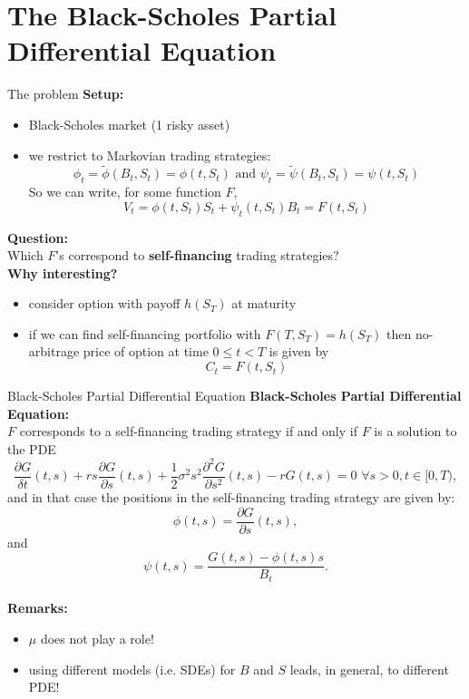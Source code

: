 \documentclass[pdf, handout]{beamer}
\begin{document}
\section[toc=Black-Scholes PDE]{The Black-Scholes Partial Differential Equation}

\begin{frame}{The problem}
\textbf{Setup:}
\begin{itemize}
\item Black-Scholes market (1 risky asset)
\item we restrict to
Markovian trading strategies:
\[
\phi_t=\tilde\phi(B_t, S_t)= \phi(t,S_t) \text{ and } \psi_t=\tilde\psi(B_t, S_t)
=\psi (t, S_t)
\]
So we can write, for some function $F$,
\[
 V_t=\phi(t, S_t) S_t + \psi_t(t, S_t) B_t=F(t, S_t)
\]
\end{itemize}
\textbf{Question:} \\
Which $F$'s correspond to \textbf{self-financing} trading strategies?
\\ \vspace{.25cm}
\textbf{Why interesting?}
\begin{itemize}
\item consider option with payoff $h(S_T)$ at maturity
\item if we can find self-financing portfolio with $F(T, S_T)= h(S_T)$ then
no-arbitrage price of option at time $0\leq t <T$ is given by
\[
C_t=F(t, S_t)
\]
\end{itemize}
\end{frame}

\begin{frame}{Black-Scholes Partial Differential Equation}
\textbf{Black-Scholes Partial Differential Equation:} \\
$F$ corresponds to a self-financing trading strategy if and only if $F$ is a solution to the PDE
\[
\frac{\partial G}{\delta t}(t, s) + r s \frac{\partial G}{\partial
s}(t, s) + \frac{1}{2}\sigma^2 s^2 \frac{\partial^2 G}{\partial
s^2}(t,s) -r G(t,s )=0\,\, \forall s>0, t\in[0, T),
\]
and in that case the positions in the self-financing trading strategy are given by:
\[
\phi(t,s)=\frac{\partial G}{\partial s}(t, s),
\]
and
\[
\psi(t,s)=\frac{G(t,s)-\phi(t,s) s}{B_t}.
\]
\\ \vspace{.3cm}
\textbf{Remarks:}
\begin{itemize}
\item  $\mu$ does not play a role!
\item using different models (i.e. SDEs)
for $B$ and $S$ leads, in general, to
different PDE!
\end{itemize}
\end{frame}
\end{document}
